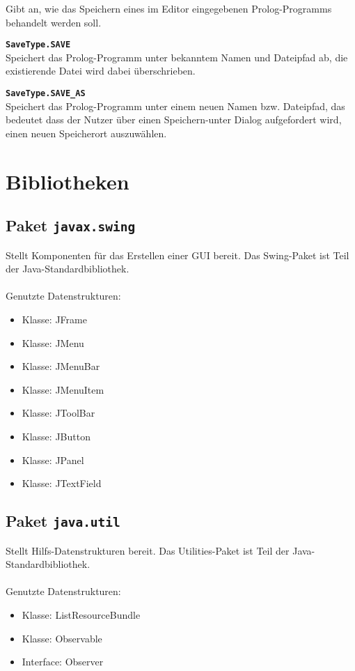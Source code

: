 \documentclass[parskip=full,11pt,twoside]{scrartcl}
\begin{document}
Gibt an, wie das Speichern eines im Editor eingegebenen Prolog-Programms behandelt werden soll.

\textbf{\texttt{SaveType.SAVE}}\\
Speichert das Prolog-Programm unter bekanntem Namen und Dateipfad ab, die existierende Datei wird dabei überschrieben.

\textbf{\texttt{SaveType.SAVE\_AS}}\\
Speichert das Prolog-Programm unter einem neuen Namen bzw. Dateipfad, das bedeutet dass der Nutzer über einen Speichern-unter Dialog aufgefordert wird, einen neuen Speicherort auszuwählen.

\section{Bibliotheken}

\subsection{Paket \texttt{javax.swing}}
Stellt Komponenten für das Erstellen einer GUI bereit. Das Swing-Paket ist Teil der Java-Standardbibliothek.\\\\Genutzte Datenstrukturen:

\begin{multicols}{2}
\begin{itemize}
	\item Klasse: JFrame
	\item Klasse: JMenu	
	\item Klasse: JMenuBar
	\item Klasse: JMenuItem
	\item Klasse: JToolBar
	\item Klasse: JButton
	\item Klasse: JPanel
	\item Klasse: JTextField
\end{itemize}
\end{multicols}

\subsection{Paket \texttt{java.util}}
Stellt Hilfs-Datenstrukturen bereit. Das Utilities-Paket ist Teil der Java-Standardbibliothek.\\\\Genutzte Datenstrukturen:

\begin{multicols}{2}
\begin{itemize}
	\item Klasse: ListResourceBundle
	\item Klasse: Observable
	\item Interface: Observer
\end{itemize}
\end{multicols}
\end{document}
